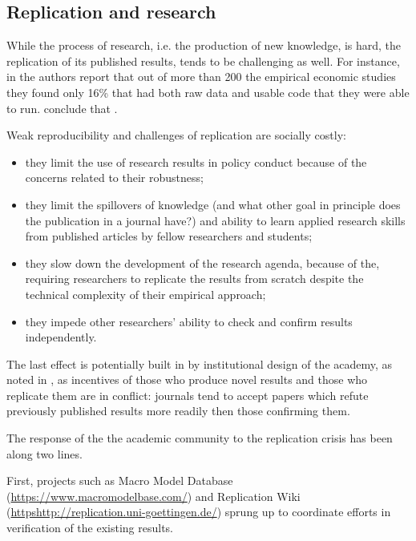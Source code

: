 \documentclass[12pt]{article}
\begin{document}
\subsection{Replication and research}

While the process of research, i.e. the production of new knowledge, is hard, the replication of its published results, tends to be challenging as well. For instance, in \cite{gertler2018make} the authors report that out of more than 200 the empirical economic studies they found only 16\% that had both raw data and usable code that they were able to run.  \cite{ioannidis2017power} conclude that .

Weak reproducibility and challenges of replication are socially costly: 
\begin{itemize}
    \item they limit the use of research results in policy conduct because of the concerns related to their robustness;
    \item they limit the spillovers of knowledge (and what other goal in principle does the publication in a journal have?) and ability to learn applied research skills from published articles by fellow researchers and students;
    \item they slow down the development of the research agenda, because of the, requiring researchers to replicate the results from scratch despite the technical complexity of their empirical approach;  %
    \item they impede other researchers' ability to check and confirm results independently.
\end{itemize}

The last effect is potentially built in by institutional design of the academy, as noted in \cite{gertler2018make}, as incentives of those who produce novel results and those who replicate them are in conflict: journals tend to accept papers which refute previously published results more readily then those confirming them. 

The response of the the academic community to the replication crisis has been along two lines.

First, projects such as Macro Model Database (\href{https://www.macromodelbase.com/}{https://www.macromodelbase.com/}) and Replication Wiki  (\href{http://replication.uni-goettingen.de/}{httpshttp://replication.uni-goettingen.de/}) sprung up to coordinate efforts in verification of the existing results. %
\end{document}
